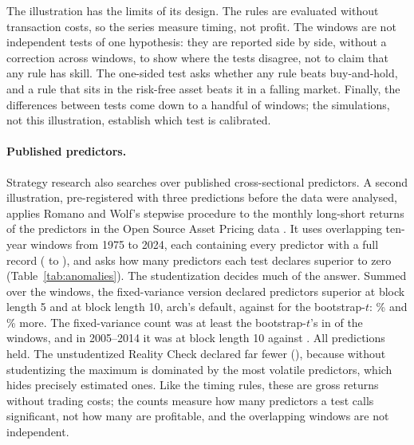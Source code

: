 The illustration has the limits of its design. The rules are evaluated without transaction costs, so the series measure timing, not profit. The windows are not independent tests of one hypothesis: they are reported side by side, without a correction across windows, to show where the tests disagree, not to claim that any rule has skill. The one-sided test asks whether any rule beats buy-and-hold, and a rule that sits in the risk-free asset beats it in a falling market. Finally, the differences between tests come down to a handful of windows; the simulations, not this illustration, establish which test is calibrated.

\paragraph{Published predictors.} Strategy research also searches over published cross-sectional predictors. A second illustration, pre-registered with three predictions before the data were analysed, applies Romano and Wolf's stepwise procedure to the monthly long-short returns of the predictors in the Open Source Asset Pricing data \citep{chen2022open}. It uses  overlapping ten-year windows from 1975 to 2024, each containing every predictor with a full record ( to ), and asks how many predictors each test declares superior to zero (Table~\ref{tab:anomalies}). The studentization decides much of the answer. Summed over the windows, the fixed-variance version declared  predictors superior at block length 5 and  at block length 10, arch's default, against  for the bootstrap-$t$: \% and \% more. The fixed-variance count was at least the bootstrap-$t$'s in  of the  windows, and in 2005--2014 it was  at block length 10 against . All  predictions held. The unstudentized Reality Check declared far fewer (), because without studentizing the maximum is dominated by the most volatile predictors, which hides precisely estimated ones. Like the timing rules, these are gross returns without trading costs; the counts measure how many predictors a test calls significant, not how many are profitable, and the overlapping windows are not independent.
